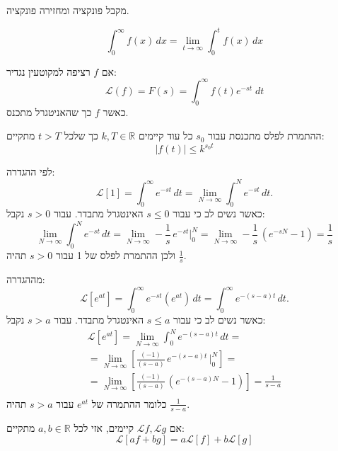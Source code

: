 \documentclass{tstextbook}
\begin{document}
\begin{definition}[התמרה]
מקבל פונקציה ומחזירה פונקציה.

\end{definition}
\begin{reminder}
$$\int_{0}^{\infty} f(x) \, dx =\lim_{ t \to \infty } \int_{0}^{t} f(x) \, dx $$

\end{reminder}
\begin{definition}
אם \(f\) רציפה למקוטעין נגדיר:$$\mathcal{L}(f)=F(s)=\int_0^\infty f(t)e^{-st} \; dt$$
כאשר \(f\) כך שהאניטגרל מתכנס.

\end{definition}
\begin{proposition}
ההתמרת לפלס מתכנסת עבור \(s_{0}\) כל עוד קיימים \(k,T \in \mathbb{R}\) כך שלכל \(t>T\) מתקיים:
$$\lvert f(t) \rvert \leq k ^{s_{0}t}$$

\end{proposition}
\begin{example}
לפי ההגדרה:
$${\mathcal{L}}[1]=\int_{0}^{\infty}e^{-s t}\,d t=\operatorname*{lim}_{N\to\infty}\int_{0}^{N}e^{-s t}\,d t.$$
כאשר נשים לב כי עבור \(s\leq 0\) האינטגרל מתבדר. עבור \(s>0\) נקבל:
$$\operatorname*{lim}_{N\to\infty}\int_{0}^{N}e^{-s t}\,d t=\operatorname*{lim}_{N\to\infty}-{\frac{1}{s}}\,e^{-s t}{\Big|}_{0}^{N}=\operatorname*{lim}_{N\to\infty}-{\frac{1}{s}}\,(e^{-s N}-1)=\frac{1}{s}$$
ולכן ההתמרת לפלס של 1 עבור \(s>0\) תהיה \(\frac{1}{s}\).

\end{example}
\begin{example}
מההגדרה:
$${\mathcal{L}}[e^{a t}]=\int_{0}^{\infty}e^{-s t}(e^{a t})\,d t=\int_{0}^{\infty}e^{-(s-a)t}\,d t.$$
כאשר נשים לב כי עבור \(s\leq a\) האינטגרל מתבדר. עבור \(s>a\) נקבל:
$$\begin{gather}{\mathcal{L}}[e^{a t}]=\operatorname*{lim}_{N\to\infty}\int_{0}^{N}e^{-(s-a)t}\,d t=\\{{=\operatorname*{lim}_{N\to\infty}\left[\frac{(-1)}{(s-a)}\,e^{-(s-a)t}\,{\bigg|}_{0}^{N}\right]}}=\\ {{=\operatorname*{lim}_{N\to\infty}\left[\frac{(-1)}{(s-a)}\,(e^{-(s-a)N}-1)\right]}}= \frac{1}{s-a}\\\end{gather}$$
כלומר ההתמרה של \(e^{at}\) עבור \(s> a\) תהיה \(\frac{1}{s-a}\).

\end{example}
\begin{proposition}[לינאריות]
אם \(\mathcal{L}f,\mathcal{L}g\) קיימים, אזי לכל \(a,b \in \mathbb{R}\) מתקיים:
$${\mathcal{L}}[a f+b g]=a{\mathcal{L}}[f]+b{\mathcal{L}}[g]$$

\end{proposition}
\end{document}
